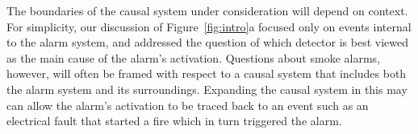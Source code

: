 \documentclass[10pt,letterpaper]{article}
\begin{document}
The boundaries of the causal system under consideration will depend on context. For simplicity, our discussion of Figure~\ref{fig:intro}a focused only on events internal to the alarm system, and addressed the question of which detector is best viewed as the main cause of the alarm's activation. Questions about smoke alarms, however, will often be framed with respect to a causal system that includes both the alarm system and its surroundings. Expanding the causal system in this may can allow the alarm's activation to be traced back to an event such as an electrical fault that started a fire which in turn triggered the alarm.




\end{document}
